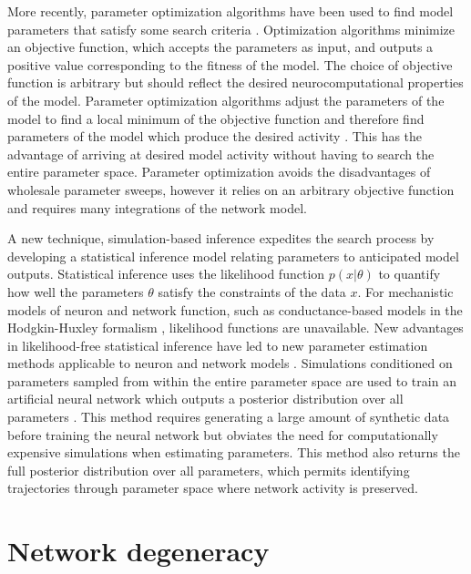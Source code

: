 \documentclass[a4paper,10pt]{article} %
\begin{document}
More recently, parameter optimization algorithms have been used to find model parameters that satisfy some search criteria
\parencite{hoylandDifferentialResponsesNeuromodulation2018, gorur-shandilyaXolotlIntuitiveApproachable2018, alonsoVisualizationCurrentsNeural2019}.
Optimization algorithms minimize an objective function, which accepts the parameters as input,
and outputs a positive value corresponding to the fitness of the model.
The choice of objective function is arbitrary but should reflect the desired neurocomputational properties of the model.
Parameter optimization algorithms adjust the parameters of the model to find a local minimum of the objective function
and therefore find parameters of the model which produce the desired activity \parencite{bangaOptimizationComputationalSystems2008}.
This has the advantage of arriving at desired model activity without having to search the entire parameter space.
Parameter optimization avoids the disadvantages of wholesale parameter sweeps,
however it relies on an arbitrary objective function
and requires many integrations of the network model.

A new technique, simulation-based inference expedites the search process
by developing a statistical inference model relating parameters to anticipated model outputs.
Statistical inference uses the likelihood function $p(x | \theta)$ to quantify
how well the parameters $\theta$ satisfy the constraints of the data $x$.
For mechanistic models of neuron and network function, such as conductance-based models in the Hodgkin-Huxley formalism
\parencite{hodgkinQuantitativeDescriptionMembrane1952},
likelihood functions are unavailable.
New advantages in likelihood-free statistical inference have led to
new parameter estimation methods applicable to neuron and network models \parencite{cranmerFrontierSimulationbasedInference2019}.
Simulations conditioned on parameters sampled from within the entire parameter space
are used to train an artificial neural network which outputs a posterior distribution over all parameters
\parencite{goncalvesTrainingDeepNeural2019, lueckmannFlexibleStatisticalInference2017}.
This method requires generating a large amount of synthetic data before training the neural network
but obviates the need for computationally expensive simulations when estimating parameters.
This method also returns the full posterior distribution over all parameters,
which permits identifying trajectories through parameter space where network activity is preserved.

\section{Network degeneracy}
\end{document}
